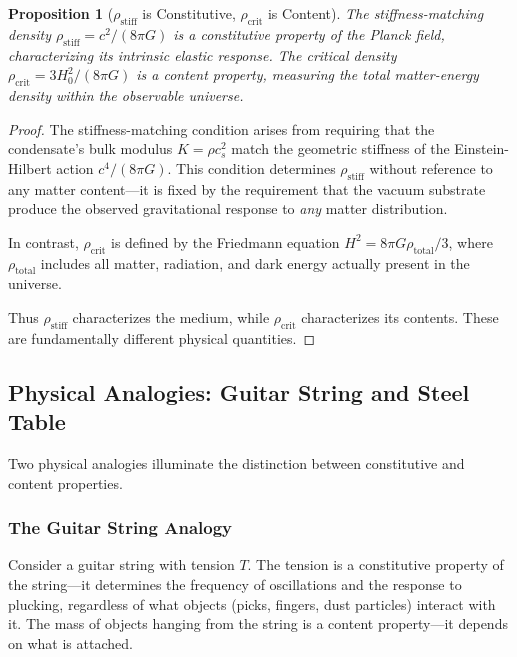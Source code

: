 \documentclass[11pt,a4paper]{article}
\newcommand{\rhocrit}{\ensuremath{\rho_{\mathrm{crit}}}}
\newcommand{\rhostiff}{\ensuremath{\rho_{\mathrm{stiff}}}}
\newtheorem{proposition}{Proposition}
\theoremstyle{definition}
\begin{document}
\begin{proposition}[$\rhostiff$ is Constitutive, $\rhocrit$ is Content]
\label{prop:constitutive_content}
The stiffness-matching density $\rhostiff = c^2/(8\pi G)$ is a \emph{constitutive property} of the Planck field, characterizing its intrinsic elastic response. The critical density $\rhocrit = 3H_0^2/(8\pi G)$ is a \emph{content property}, measuring the total matter-energy density within the observable universe.
\end{proposition}

\begin{proof}
The stiffness-matching condition arises from requiring that the condensate's bulk modulus $K = \rho c_s^2$ match the geometric stiffness of the Einstein-Hilbert action $c^4/(8\pi G)$. This condition determines $\rhostiff$ without reference to any matter content---it is fixed by the requirement that the vacuum substrate produce the observed gravitational response to \emph{any} matter distribution.

In contrast, $\rhocrit$ is defined by the Friedmann equation $H^2 = 8\pi G \rho_{\mathrm{total}}/3$, where $\rho_{\mathrm{total}}$ includes all matter, radiation, and dark energy actually present in the universe.

Thus $\rhostiff$ characterizes the medium, while $\rhocrit$ characterizes its contents. These are fundamentally different physical quantities.
\end{proof}

\subsection{Physical Analogies: Guitar String and Steel Table}
\label{sec:analogies}

Two physical analogies illuminate the distinction between constitutive and content properties.

\subsubsection{The Guitar String Analogy}
\label{sec:guitar_analogy}

Consider a guitar string with tension $T$. The tension is a constitutive property of the string---it determines the frequency of oscillations and the response to plucking, regardless of what objects (picks, fingers, dust particles) interact with it. The mass of objects hanging from the string is a content property---it depends on what is attached.
\end{document}
